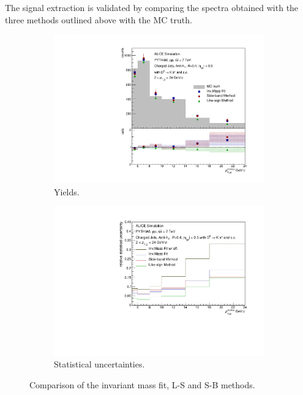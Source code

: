 The signal extraction is validated by comparing the spectra obtained with the three methods outlined above with the MC truth. 
\begin{figure}[tbh]
\centering
\begin{subfigure}{0.49\textwidth}
  \centering
  \includegraphics[width=1.0\linewidth]{img/HQ16_Simulation_MethodComparison}
  \caption{Yields.}
  \label{fig:HQ16_Simulation_MethodComparison}
\end{subfigure}
\begin{subfigure}{0.49\textwidth}
  \centering
  \includegraphics[width=1.0\linewidth]{img/HQ16_Simulation_UncertaintyComparison}
  \caption{Statistical uncertainties.}
  \label{fig:HQ16_Simulation_UncertaintyComparison}
\end{subfigure}
\caption{Comparison of the invariant mass fit, L-S and S-B methods.}
\label{fig:MethComp}
\end{figure}
